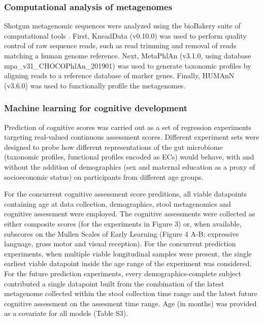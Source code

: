 \documentclass{article}
\begin{document}
\subsubsection*{Computational analysis of metagenomes}

Shotgun metagenomic sequences were analyzed using the bioBakery suite of
computational tools \cite{beghiniIntegratingTaxonomicFunctional2021}.
First, KneadData (v0.10.0) was used to perform quality
control of raw sequence reads, such as read trimming and removal of
reads matching a human genome reference. Next, MetaPhlAn (v3.1.0, using
database mpa\_v31\_CHOCOPhlAn\_201901) was used to generate taxonomic
profiles by aligning reads to a reference database of marker genes.
Finally, HUMAnN (v3.6.0) was used to functionally profile the
metagenomes.

\subsubsection*{Machine learning for cognitive development}

Prediction of cognitive scores was carried out as a set of regression
experiments targeting real-valued continuous assessment scores.
Different experiment sets were designed to probe how different
representations of the gut microbiome (taxonomic profiles, functional
profiles encoded as ECs) would behave, with and without the addition of
demographics (sex and maternal education as a proxy of socioeconomic
status) on participants from different age groups.

For the concurrent cognitive assessment score preditions,
all viable datapoints containing 
age at data collection, demographics, stool metagenomics and cognitive assessment were employed.
The cognitive assessments were collected as either composite scores
(for the experiments in Figure 3) or, when available, subscores on the
Mullen Scales of Early Learning (Figure 4 A-B: expressive language, gross motor and visual reception).
For the concurrent prediction experiments, when multiple viable longitudinal samples were present,
the single earliest viable datapoint inside the age range of the experiment was considered.
For the future prediction experiments, every demographics-complete subject
contributed a single datapoint built from the combination of
the latest metagenome collected within the stool collection time range and
the latest future cognitive assessment on the assesment time range.
Age (in months) was provided as a covariate for all models (Table S3).
\end{document}
